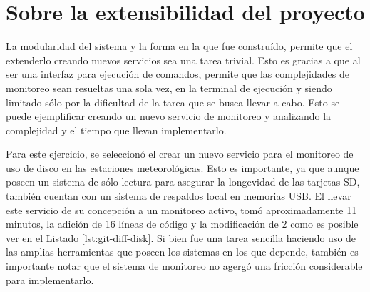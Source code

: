 

\section{Sobre la extensibilidad del proyecto}

La modularidad del sistema y la forma en la que fue construído, permite que el extenderlo creando nuevos servicios sea una tarea trivial. Esto es gracias a que al ser una interfaz para ejecución de comandos, permite que las complejidades de monitoreo sean resueltas una sola vez, en la terminal de ejecución y siendo limitado sólo por la dificultad de la tarea que se busca llevar a cabo. Esto se puede ejemplificar creando un nuevo servicio de monitoreo y analizando la complejidad y el tiempo que llevan implementarlo.

Para este ejercicio, se seleccionó el crear un nuevo servicio para el monitoreo de uso de disco en las estaciones meteorológicas. Esto es importante, ya que aunque poseen un sistema de sólo lectura para asegurar la longevidad de las tarjetas SD, también cuentan con un sistema de respaldos local en memorias USB. El llevar este servicio de su concepción a un monitoreo activo, tomó aproximadamente 11 minutos, la adición de 16 líneas de código y la modificación de 2 como es posible ver en el Listado \ref{lst:git-diff-disk}. Si bien fue una tarea sencilla haciendo uso de las amplias herramientas que poseen los sistemas en los que depende, también es importante notar que el sistema de monitoreo no agergó una fricción considerable para implementarlo.

